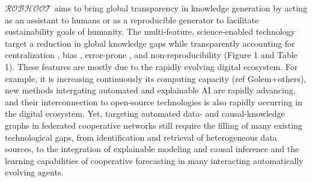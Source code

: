 \documentclass[11pt, a4paper]{article} %
\begin{document}
  $\mathcal{ROBHOOT}$ aims to bring global transparency in knowledge
  generation by acting as an assistant to humans or as a reproducible
  generator to facilitate sustainability goals of humanity. The
  multi-feature, science-enabled technology target a reduction in
  global knowledge gaps while transparently accounting for
  centralization \citep{Inhaber1977,Gunther2018}⁠⁠, bias⁠⁠
  \citep{Ioannidis2005}, error-prone \citep{Fang2011}, and
  non-reproducibility \citep{Hardwicke2018} (Figure 1 and Table
  1). These features are mostly due to the rapidly evolving digital
  ecosystem. For example, it is increasing continuously its computing
  capacity (ref Golem+others), new methods intergating automated and
  explainable AI are rapidly advancing, and their interconnection to
  open-source technologies is also rapidly occurring in the digital
  ecosystem. Yet, targeting automated data- and causal-knowledge
  graphs in federated cooperative networks still require the filling
  of many existing technological gaps, from identification and
  retrieval of heterogeneous data sources, to the integration of
  explainable modeling and causal inference and the learning
  capabilities of cooperative forecasting in many interacting
  automatically evolving agents.

\end{document}
